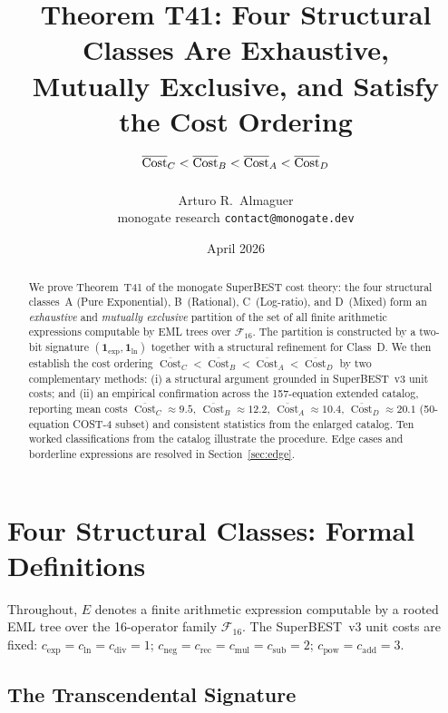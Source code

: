 \documentclass[12pt,a4paper]{article}
\title{Theorem T41: Four Structural Classes Are Exhaustive,\\
       Mutually Exclusive, and Satisfy the Cost Ordering\\[6pt]
       \large $\overline{\Cost}_C < \overline{\Cost}_B
              < \overline{\Cost}_A < \overline{\Cost}_D$}
\author{Arturo R.\ Almaguer\\
\small monogate research \quad \texttt{contact@monogate.dev}}
\date{April 2026}
\theoremstyle{definition}
\newcommand{\Cost}{\operatorname{Cost}}
\newcommand{\cexp}{c_{\mathrm{exp}}}
\newcommand{\cln}{c_{\mathrm{ln}}}
\newcommand{\cmul}{c_{\mathrm{mul}}}
\newcommand{\cdiv}{c_{\mathrm{div}}}
\newcommand{\cadd}{c_{\mathrm{add}}}
\newcommand{\csub}{c_{\mathrm{sub}}}
\newcommand{\cpow}{c_{\mathrm{pow}}}
\newcommand{\cneg}{c_{\mathrm{neg}}}
\newcommand{\crec}{c_{\mathrm{rec}}}
\begin{document}
\maketitle

\begin{abstract}
We prove Theorem~T41 of the monogate SuperBEST cost theory: the four
structural classes~A (Pure Exponential), B~(Rational), C~(Log-ratio),
and D~(Mixed) form an \emph{exhaustive} and \emph{mutually exclusive}
partition of the set of all finite arithmetic expressions computable
by EML trees over $\mathcal{F}_{16}$.
The partition is constructed by a two-bit signature
$(\mathbf{1}_{\mathrm{exp}},\mathbf{1}_{\mathrm{ln}})$ together with a
structural refinement for Class~D.
We then establish the cost ordering
$\overline{\Cost}_C < \overline{\Cost}_B < \overline{\Cost}_A
 < \overline{\Cost}_D$
by two complementary methods:
(i) a structural argument grounded in SuperBEST~v3 unit costs; and
(ii) an empirical confirmation across the 157-equation extended catalog,
reporting mean costs $\overline{\Cost}_C \approx 9.5$,
$\overline{\Cost}_B \approx 12.2$, $\overline{\Cost}_A \approx 10.4$,
$\overline{\Cost}_D \approx 20.1$ (50-equation COST-4 subset) and
consistent statistics from the enlarged catalog.
Ten worked classifications from the catalog illustrate the procedure.
Edge cases and borderline expressions are resolved in
Section~\ref{sec:edge}.
\end{abstract}

\tableofcontents
\bigskip

\section{Four Structural Classes: Formal Definitions}
\label{sec:classes}

Throughout, $E$ denotes a finite arithmetic expression computable by a
rooted EML tree over the 16-operator family $\mathcal{F}_{16}$.
The SuperBEST~v3 unit costs are fixed:
$\cexp = \cln = \cdiv = 1$;
$\cneg = \crec = \cmul = \csub = 2$;
$\cpow = \cadd = 3$.

\subsection{The Transcendental Signature}
\end{document}
